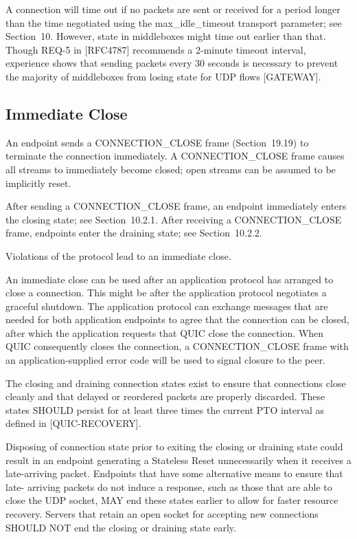 \documentclass{article}
\begin{document}
A connection will time out if no packets are sent or received for a period longer than the time negotiated using the max\_idle\_timeout transport parameter; see Section~10.  However, state in middleboxes might time out earlier than that.  Though REQ-5 in [RFC4787] recommends a 2-minute timeout interval, experience shows that sending packets every 30 seconds is necessary to prevent the majority of middleboxes from losing state for UDP flows [GATEWAY].

\subsection{Immediate Close}

An endpoint sends a CONNECTION\_CLOSE frame (Section~19.19) to terminate the connection immediately.  A CONNECTION\_CLOSE frame causes all streams to immediately become closed; open streams can be assumed to be implicitly reset.

After sending a CONNECTION\_CLOSE frame, an endpoint immediately enters the closing state; see Section~10.2.1.  After receiving a CONNECTION\_CLOSE frame, endpoints enter the draining state; see Section~10.2.2.

Violations of the protocol lead to an immediate close.

An immediate close can be used after an application protocol has arranged to close a connection.  This might be after the application protocol negotiates a graceful shutdown.  The application protocol can exchange messages that are needed for both application endpoints to agree that the connection can be closed, after which the application requests that QUIC close the connection.  When QUIC consequently closes the connection, a CONNECTION\_CLOSE frame with an application-supplied error code will be used to signal closure to the peer.

The closing and draining connection states exist to ensure that connections close cleanly and that delayed or reordered packets are properly discarded.  These states SHOULD persist for at least three times the current PTO interval as defined in [QUIC-RECOVERY].

Disposing of connection state prior to exiting the closing or draining state could result in an endpoint generating a Stateless Reset unnecessarily when it receives a late-arriving packet. Endpoints that have some alternative means to ensure that late- arriving packets do not induce a response, such as those that are able to close the UDP socket, MAY end these states earlier to allow for faster resource recovery.  Servers that retain an open socket for accepting new connections SHOULD NOT end the closing or draining state early.
\end{document}
